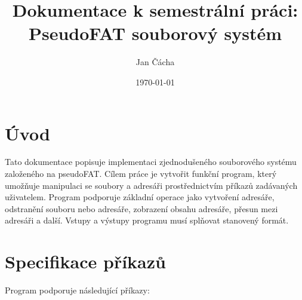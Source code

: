 \documentclass[12pt]{article}
\title{\textbf{Dokumentace k semestrální práci: PseudoFAT souborový systém}}
\author{Jan Čácha}
\date{\today}
\begin{document}
\maketitle

\section*{Úvod}
Tato dokumentace popisuje implementaci zjednodušeného souborového systému založeného na pseudoFAT. Cílem práce je vytvořit funkční program, který umožňuje manipulaci se soubory a adresáři prostřednictvím příkazů zadávaných uživatelem. Program podporuje základní operace jako vytvoření adresáře, odstranění souboru nebo adresáře, zobrazení obsahu adresáře, přesun mezi adresáři a další. Vstupy a výstupy programu musí splňovat stanovený formát.

\section*{Specifikace příkazů}
Program podporuje následující příkazy:
\end{document}
